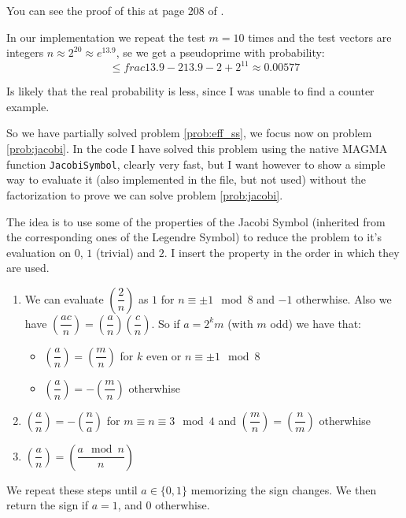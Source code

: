 \documentclass{article}
\theoremstyle{plain}
\theoremstyle{remark}
\theoremstyle{definition}
\begin{document}
You can see the proof of this at page 208 of \cite[Section 6.4.2]{stinson}.

In our implementation we repeat the test $m=10$ times and the test vectors are integers $n \approx 2^20 \approx e^{13.9}$, se we get a pseudoprime with probability:
\begin{equation*}
	\leq frac{13.9 - 2}{13.9 - 2 + 2^{11}} \approx 0.00577
\end{equation*}

Is likely that the real probability is less, since I was unable to find a counter example.

So we have partially solved problem \ref{prob:eff_ss}, we focus now on problem \ref{prob:jacobi}. In the code I have solved this problem using the native MAGMA function \texttt{JacobiSymbol}, clearly very fast, but I want however to show a simple way to evaluate it (also implemented in the file, but not used) without the factorization to prove we can solve problem \ref{prob:jacobi}.

The idea is to use some of the properties of the Jacobi Symbol (inherited from the corresponding ones of the Legendre Symbol) to reduce the problem to it's evaluation on $0$, $1$ (trivial) and $2$. I insert the property in the order in which they are used. 
\begin{enumerate}
	\item We can evaluate $ \left(\dfrac{2}{n}\right) $ as $1$ for $n\equiv \pm 1 \mod 8$ and $-1$ otherwhise. Also we have $ \left(\dfrac{ac}{n}\right) = \left(\dfrac{a}{n}\right)  \left(\dfrac{c}{n}\right) $. So if $a = 2^km$ (with $m$ odd) we have that:
	\begin{itemize}
		\item $\left(\dfrac{a}{n}\right) = \left(\dfrac{m}{n}\right)$ for $k$ even or $n\equiv \pm 1 \mod 8$ 
		\item $\left(\dfrac{a}{n}\right) = -\left(\dfrac{m}{n}\right)$ otherwhise
	\end{itemize}
	\item $\left(\dfrac{a}{n}\right) = - \left(\dfrac{n}{a}\right)$ for $m \equiv n \equiv 3 \mod 4$ and $\left(\dfrac{m}{n}\right) = \left(\dfrac{n}{m}\right)$ otherwhise
	\item $\left(\dfrac{a}{n}\right) = \left(\dfrac{a \mod n}{n}\right)$
\end{enumerate}

We repeat these steps until $a\in\{0,1\}$ memorizing the sign changes. We then return the sign if $a=1$, and $0$ otherwhise.
\end{document}

